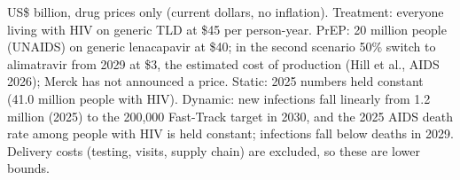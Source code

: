 \begin{table}[htbp]
\centering
\caption{Minimum drug cost of treating everyone with HIV and keeping those at risk on PrEP, 2027--2046}
\label{tab:cost_to_end_hiv}
\par\vspace{4pt}
\begin{minipage}{\textwidth}\footnotesize US\$ billion, drug prices only (current dollars, no inflation). Treatment: everyone living with HIV on generic TLD at \$45 per person-year. PrEP: 20 million people (UNAIDS) on generic lenacapavir at \$40; in the second scenario 50\% switch to alimatravir from 2029 at \$3, the estimated cost of production (Hill et al., AIDS 2026); Merck has not announced a price. Static: 2025 numbers held constant (41.0 million people with HIV). Dynamic: new infections fall linearly from 1.2 million (2025) to the 200,000 Fast-Track target in 2030, and the 2025 AIDS death rate among people with HIV is held constant; infections fall below deaths in 2029. Delivery costs (testing, visits, supply chain) are excluded, so these are lower bounds.\end{minipage}
\end{table}
